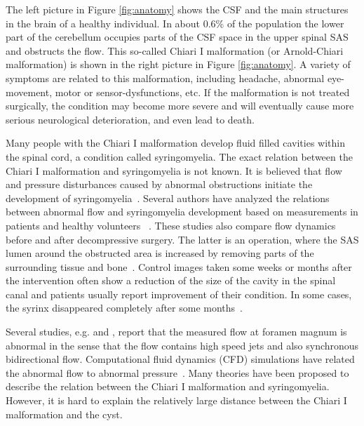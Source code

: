 The left picture in Figure \ref{fig:anatomy} shows the CSF and the
main structures in the brain of a healthy individual. In about 0.6\%
of the population the lower part of the cerebellum occupies parts of
the CSF space in the upper spinal SAS and obstructs the flow. This
so-called Chiari I malformation  (or
Arnold-Chiari malformation) is
shown in the right picture in Figure \ref{fig:anatomy}. A variety of
symptoms are related to this malformation, including headache, abnormal
eye-movement, motor or sensor-dysfunctions, etc. If the malformation
is not treated surgically, the condition may become more severe and
will eventually cause more serious neurological deterioration, and even
lead to death. 

Many people with the Chiari I malformation develop
fluid filled cavities within the spinal cord,  a
condition called syringomyelia. The exact
relation between the Chiari I malformation and syringomyelia is
 not known. It is believed that flow and pressure disturbances caused by abnormal obstructions initiate the development of
syringomyelia~\cite{OldfieldMuraszkoShawkerEtAl1994}. Several authors have
analyzed the relations between abnormal flow and syringomyelia
development based on measurements in patients and healthy volunteers
~\cite{HeissPatronasDeVroomEtAl1999,PinnaAlessandriniAlfieriEtAl2000,HofmannWarmuth-MetzBendszusEtAl2000,HaughtonKorosecMedowEtAl2003}. These studies also compare flow dynamics before and after decompressive
surgery. The latter is an operation, where the SAS lumen around the
obstructed area is increased by removing parts of the surrounding
tissue and bone~\cite{MilhoratBolognese2003}. Control
images taken some weeks or months after the intervention often show a
reduction of the size of the cavity in the spinal canal and patients
usually report improvement of their condition. In some cases, the
syrinx disappeared completely after some months~\cite{OldfieldMuraszkoShawkerEtAl1994,PinnaAlessandriniAlfieriEtAl2000,HeissPatronasDeVroomEtAl1999}.

Several studies, e.g. \cite{Quigley2004} and \cite{HaughtonKorosecMedowEtAl2003}, report that the measured flow at foramen magnum
is abnormal in the sense that the flow contains high speed jets and also synchronous bidirectional flow. 
Computational fluid dynamics (CFD) simulations have related the abnormal flow to 
abnormal
pressure~\cite{RoldanHaughtonWiebenEtAl2008,HentschelMardalLovgren2010,LingeHaughtonLovgren2010,LingeHaughtonLovgren2011}.  
Many theories have been proposed to describe the relation between the Chiari I malformation and
syringomyelia. However, it is hard to explain the relatively large distance between the 
Chiari I malformation and the cyst.  

